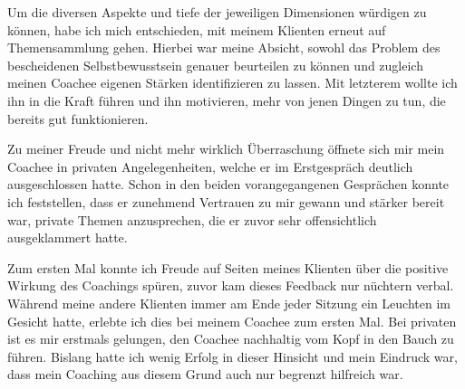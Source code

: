 \documentclass[11pt,a4paper]{article}
\begin{document}
Um die diversen Aspekte und tiefe der jeweiligen Dimensionen würdigen zu können, habe ich mich entschieden, mit meinem Klienten erneut auf Themensammlung gehen. Hierbei war meine Absicht, sowohl das Problem des bescheidenen Selbstbewusstsein genauer beurteilen zu können und zugleich meinen Coachee eigenen Stärken identifizieren zu lassen. Mit letzterem wollte ich ihn in die Kraft führen und ihn motivieren, mehr von jenen Dingen zu tun, die bereits gut funktionieren. 

Zu meiner Freude und nicht mehr wirklich Überraschung öffnete sich mir mein Coachee in privaten Angelegenheiten, welche er im Erstgespräch deutlich ausgeschlossen hatte. Schon in den beiden vorangegangenen Gesprächen konnte ich feststellen, dass er zunehmend Vertrauen zu mir gewann und stärker bereit war, private Themen anzusprechen, die er zuvor sehr offensichtlich ausgeklammert hatte.


Zum ersten Mal konnte ich Freude auf Seiten meines Klienten über die positive Wirkung des Coachings spüren, zuvor kam dieses Feedback nur nüchtern verbal. Während meine andere Klienten immer am Ende jeder Sitzung ein Leuchten im Gesicht hatte, erlebte ich dies bei meinem Coachee zum ersten Mal. Bei privaten ist es mir erstmals gelungen, den Coachee nachhaltig vom Kopf in den Bauch zu führen. Bislang hatte ich wenig Erfolg in dieser Hinsicht und mein Eindruck war, dass mein Coaching aus diesem Grund auch nur begrenzt hilfreich war.


\subsection*{\color{Orange}{Sechste Sitzung: Abschlusssitzung}}
\end{document}
